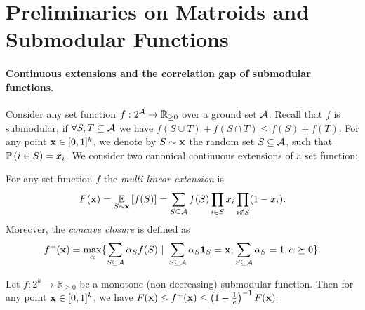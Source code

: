 \section{Preliminaries on Matroids and Submodular Functions}\label{sec:definition}

\paragraph{Continuous extensions and the correlation gap of submodular functions.}

Consider any set function $f : 2^{\operatorname{\mathcal{A}}} \rightarrow \mathbb{R}_{\geq 0}$ over a ground set $\operatorname{\mathcal{A}}$. Recall that $f$ is submodular, if $\forall S,T \subseteq \operatorname{\mathcal{A}}$ we have $f(S \cup T) + f(S \cap T) \leq f(S) + f(T)$. For any point $\operatorname{\mathbf{x}} \in [0,1]^k$, we denote by $S \sim \operatorname{\mathbf{x}}$ the random set $S \subseteq \operatorname{\mathcal{A}}$, such that $\mathop{\mathbb{P}\left(i \in S\right)} = x_i$. We consider two canonical continuous extensions of a set function: 

\begin{definition}
For any set function $f$ the {\em multi-linear extension} is
\begin{align*}
    F(\operatorname{\mathbf{x}}) = \mathop{\underset{S \sim \operatorname{\mathbf{x}}}{\mathbb{E}}\left[f(S)\right]} = \sum_{S \subseteq \operatorname{\mathcal{A}}} f(S) \prod_{i \in S} x_i \prod_{i \notin S} (1-x_i).
\end{align*}
Moreover, the {\em concave closure} is defined as
\begin{align*}
    f^+(\operatorname{\mathbf{x}}) = \max_{\alpha}\{\sum_{S \subseteq \operatorname{\mathcal{A}}} \alpha_S f(S)~|~\sum_{S \subseteq \operatorname{\mathcal{A}}} \alpha_S \bm{1}_S = \operatorname{\mathbf{x}}, \sum_{S \subseteq \operatorname{\mathcal{A}}} \alpha_S = 1, \alpha \succeq 0\}.
\end{align*}
\end{definition}

\begin{lemma} \label{lem:correlationgap}
Let $f: 2^k \rightarrow \mathbb{R}_{\geq 0}$ be a monotone (non-decreasing) submodular function. Then for any point $\operatorname{\mathbf{x}} \in [0,1]^k$, we have
$
F(\operatorname{\mathbf{x}}) \leq f^+(\operatorname{\mathbf{x}}) \leq \left(1 - \frac{1}{e}\right)^{-1} F(\operatorname{\mathbf{x}}).
$
\end{lemma}


